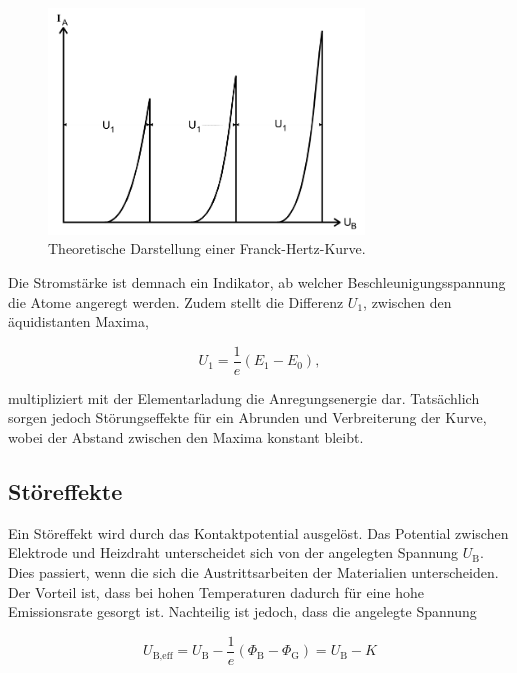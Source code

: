 \begin{figure}[H]
  \centering
  \includegraphics[height=6cm]{ressources/kurve1.png}
  \caption{Theoretische Darstellung einer Franck-Hertz-Kurve. \cite{skript}}
  \label{fig:2}
\end{figure}

Die Stromstärke ist demnach ein Indikator, ab welcher Beschleunigungsspannung die Atome angeregt werden.
Zudem stellt die Differenz $U_1$, zwischen den äquidistanten Maxima,

\begin{equation}
  U_1 = \frac{1}{e}(E_1-E_0), \label{eqn:5}
\end{equation}

multipliziert mit der Elementarladung die Anregungsenergie dar.
Tatsächlich sorgen jedoch Störungseffekte für ein Abrunden und Verbreiterung der Kurve, wobei der Abstand zwischen den Maxima konstant bleibt.

\subsection{Störeffekte}

Ein Störeffekt wird durch das Kontaktpotential ausgelöst.
Das Potential zwischen Elektrode und Heizdraht unterscheidet sich von der angelegten Spannung $U_{\text{B}}$.
Dies passiert, wenn die sich die Austrittsarbeiten der Materialien unterscheiden.
Der Vorteil ist, dass bei hohen Temperaturen dadurch für eine hohe Emissionsrate gesorgt ist.
Nachteilig ist jedoch, dass die angelegte Spannung

\begin{equation}
  U_{\text{B,eff}} = U_{\text{B}} - \frac{1}{e}(\Phi_{\text{B}} - \Phi_{\text{G}}) = U_{\text{B}} - K \label{eqn:6}
\end{equation}

